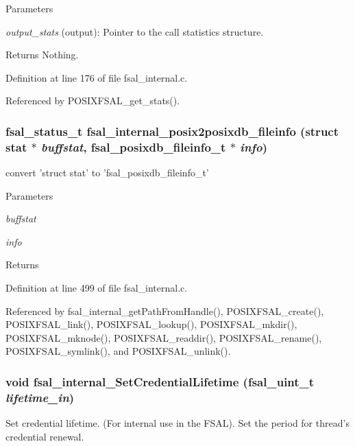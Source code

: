 \begin{DoxyParams}{Parameters}
\item[{\em output\_\-stats}](output): Pointer to the call statistics structure.\end{DoxyParams}
\begin{DoxyReturn}{Returns}
Nothing. 
\end{DoxyReturn}


Definition at line 176 of file fsal\_\-internal.c.

Referenced by POSIXFSAL\_\-get\_\-stats().
\subsubsection[{fsal\_\-internal\_\-posix2posixdb\_\-fileinfo}]{\setlength{\rightskip}{0pt plus 5cm}fsal\_\-status\_\-t fsal\_\-internal\_\-posix2posixdb\_\-fileinfo (struct stat $\ast$ {\em buffstat}, \/  fsal\_\-posixdb\_\-fileinfo\_\-t $\ast$ {\em info})}\label{fsal__internal_8c_a74cafedfe428119905b75096553c05bb}


convert 'struct stat' to 'fsal\_\-posixdb\_\-fileinfo\_\-t' 
\begin{DoxyParams}{Parameters}
\item[{\em buffstat}]\item[{\em info}]\end{DoxyParams}
\begin{DoxyReturn}{Returns}

\end{DoxyReturn}


Definition at line 499 of file fsal\_\-internal.c.

Referenced by fsal\_\-internal\_\-getPathFromHandle(), POSIXFSAL\_\-create(), POSIXFSAL\_\-link(), POSIXFSAL\_\-lookup(), POSIXFSAL\_\-mkdir(), POSIXFSAL\_\-mknode(), POSIXFSAL\_\-readdir(), POSIXFSAL\_\-rename(), POSIXFSAL\_\-symlink(), and POSIXFSAL\_\-unlink().
\subsubsection[{fsal\_\-internal\_\-SetCredentialLifetime}]{\setlength{\rightskip}{0pt plus 5cm}void fsal\_\-internal\_\-SetCredentialLifetime (fsal\_\-uint\_\-t {\em lifetime\_\-in})}\label{fsal__internal_8c_a52fbd60f6f8f222868f133a1ca585bd1}
Set credential lifetime. (For internal use in the FSAL). Set the period for thread's credential renewal.


